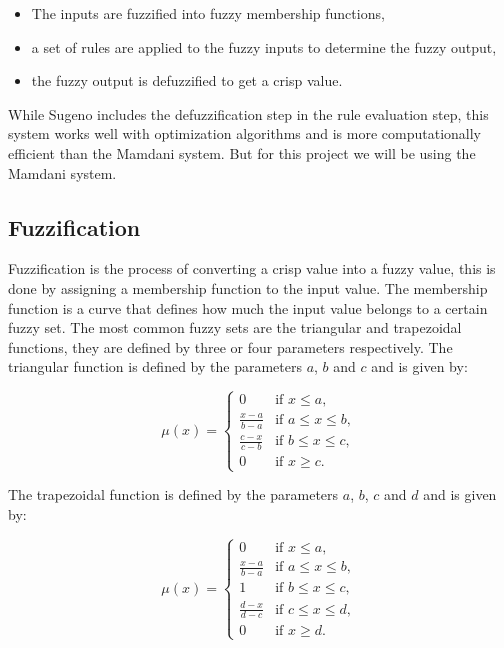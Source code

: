 \begin{itemize}
	\item The inputs are fuzzified into fuzzy membership functions,
	\item a set of rules are applied to the fuzzy inputs to determine the fuzzy output,
	\item the fuzzy output is defuzzified to get a crisp value.
\end{itemize}

While Sugeno includes the defuzzification step in the rule evaluation step, this system works well with optimization
algorithms and is more computationally efficient than the Mamdani system. But for this project we will be using the
Mamdani system.

\subsection{Fuzzification}
\label{subsec:fuzzy-fuzzification}

Fuzzification is the process of converting a crisp value into a fuzzy value, this is done by assigning a membership
function to the input value. The membership function is a curve that defines how much the input value belongs to a
certain fuzzy set. The most common fuzzy sets are the triangular and trapezoidal functions, they are defined by three
or four parameters respectively. The triangular function is defined by the parameters $a$, $b$ and $c$ and is given by:

\begin{equation}
	\mu(x) = \begin{cases}
		0                   & \text{if } x \leq a,        \\
		\frac{x - a}{b - a} & \text{if } a \leq x \leq b, \\
		\frac{c - x}{c - b} & \text{if } b \leq x \leq c, \\
		0                   & \text{if } x \geq c.
	\end{cases}
\end{equation}

The trapezoidal function is defined by the parameters $a$, $b$, $c$ and $d$ and is given by:

\begin{equation}
	\mu(x) = \begin{cases}
		0                   & \text{if } x \leq a,        \\
		\frac{x - a}{b - a} & \text{if } a \leq x \leq b, \\
		1                   & \text{if } b \leq x \leq c, \\
		\frac{d - x}{d - c} & \text{if } c \leq x \leq d, \\
		0                   & \text{if } x \geq d.
	\end{cases}
\end{equation}

